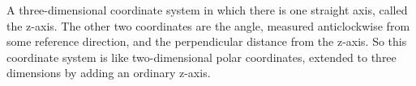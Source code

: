 A three-dimensional coordinate system in which there is one straight axis, 
called the z-axis. The other two coordinates are the angle, measured anticlockwise
from some reference direction, and the perpendicular distance from the z-axis.
So this coordinate system is like two-dimensional polar coordinates, extended to
three dimensions by adding an ordinary z-axis.